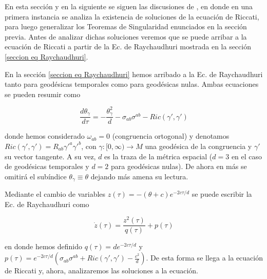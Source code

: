 En esta sección y en la siguiente se siguen las discusiones de \citep{2011CQGra..28l5009F}, en donde en una primera instancia se analiza la existencia de soluciones de la ecuación de Riccati, para luego generalizar los Teoremas de Singularidad enunciados en la sección previa. Antes de analizar dichas soluciones veremos que se puede arribar a la ecuación de Riccati a partir de la Ec. de Raychaudhuri mostrada en la sección \ref{seccion eq Raychaudhuri}.

En la sección \ref{seccion eq Raychaudhuri} hemos arribado a la Ec. de Raychaudhuri tanto para geodésicas temporales como para geodésicas nulas. Ambas ecuaciones se pueden resumir como

\[ \frac{d\theta_\gamma}{d\tau}=-\frac{\theta_\gamma^2}{d}-\sigma_{ab}\sigma^{ab}-Ric(\gamma',\gamma') \]

donde hemos considerado $\omega_{ab}=0$ (congruencia ortogonal) y denotamos $Ric(\gamma',\gamma')=R_{ab}\gamma'^a\gamma'^b$, con $\gamma:[0,\infty)\rightarrow M$ una geodésica de la congruencia y $\gamma'$ su vector tangente. A su vez, $d$ es la traza de la métrica espacial ($d=3$ en el caso de geodésicas temporales y $d=2$ para geodésicas nulas). De ahora en más se omitirá el subíndice $\theta_\gamma\equiv \theta$ dejando más amena su lectura. 

Mediante el cambio de variables $z(\tau)=-(\theta+c)e^{-2c\tau/d}$ se puede escribir la Ec. de Raychaudhuri como

$$
\dot{z}(\tau)=\frac{z^2(\tau)}{q(\tau)} + p(\tau)
$$

en donde hemos definido $q(\tau)=de^{-2c\tau/d}$ y $p(\tau)=e^{-2c\tau/d}\left( \sigma_{ab}\sigma^{ab} + Ric(\gamma',\gamma')-\frac{c^2}{d}\right)$. De esta forma se llega a la ecuación de Riccati y, ahora, analizaremos las soluciones a la ecuación.



